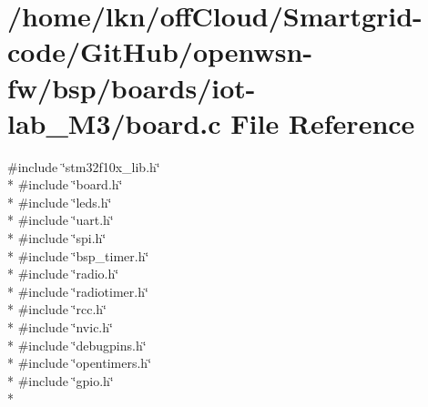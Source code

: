 \hypertarget{iot-lab___m3_2board_8c}{}\section{/home/lkn/off\+Cloud/\+Smartgrid-\/code/\+Git\+Hub/openwsn-\/fw/bsp/boards/iot-\/lab\+\_\+\+M3/board.c File Reference}
\label{iot-lab___m3_2board_8c}
{\ttfamily \#include \char`\"{}stm32f10x\+\_\+lib.\+h\char`\"{}}\\*
{\ttfamily \#include \char`\"{}board.\+h\char`\"{}}\\*
{\ttfamily \#include \char`\"{}leds.\+h\char`\"{}}\\*
{\ttfamily \#include \char`\"{}uart.\+h\char`\"{}}\\*
{\ttfamily \#include \char`\"{}spi.\+h\char`\"{}}\\*
{\ttfamily \#include \char`\"{}bsp\+\_\+timer.\+h\char`\"{}}\\*
{\ttfamily \#include \char`\"{}radio.\+h\char`\"{}}\\*
{\ttfamily \#include \char`\"{}radiotimer.\+h\char`\"{}}\\*
{\ttfamily \#include \char`\"{}rcc.\+h\char`\"{}}\\*
{\ttfamily \#include \char`\"{}nvic.\+h\char`\"{}}\\*
{\ttfamily \#include \char`\"{}debugpins.\+h\char`\"{}}\\*
{\ttfamily \#include \char`\"{}opentimers.\+h\char`\"{}}\\*
{\ttfamily \#include \char`\"{}gpio.\+h\char`\"{}}\\*
